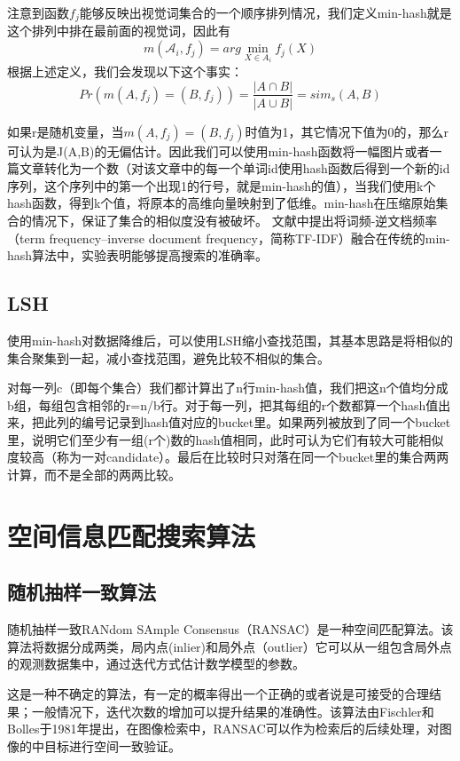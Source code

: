 注意到函数\(f_j\)能够反映出视觉词集合的一个顺序排列情况，我们定义min-hash就是这个排列中排在最前面的视觉词，因此有
\[m(\mathcal{A}_i,f_j)= arg\mathop {\min }\limits_{X \in A_i}f_j(X)\]
根据上述定义，我们会发现以下这个事实：
\[Pr(m(A,f_j) = (B,f_j)) = \frac{|A\cap{B}|}{|A\cup{B}|} = sim_s(A,B)\]

如果r是随机变量，当\(m(A,f_j) = (B,f_j)\)时值为1，其它情况下值为0的，那么r可认为是J(A,B)的无偏估计。因此我们可以使用min-hash函数将一幅图片或者一篇文章转化为一个数（对该文章中的每一个单词id使用hash函数后得到一个新的id序列，这个序列中的第一个出现1的行号，就是min-hash的值），当我们使用k个hash函数，得到k个值，将原本的高维向量映射到了低维。min-hash在压缩原始集合的情况下，保证了集合的相似度没有被破坏。
文献\cite{Chum:2008jo}中提出将词频-逆文档频率（term frequency–inverse document frequency，简称TF-IDF）融合在传统的min-hash算法中，实验表明能够提高搜索的准确率。

\subsection{LSH}
使用min-hash对数据降维后，可以使用LSH缩小查找范围，其基本思路是将相似的集合聚集到一起，减小查找范围，避免比较不相似的集合。

对每一列c（即每个集合）我们都计算出了n行min-hash值，我们把这n个值均分成b组，每组包含相邻的r=n/b行。对于每一列，把其每组的r个数都算一个hash值出来，把此列的编号记录到hash值对应的bucket里。如果两列被放到了同一个bucket里，说明它们至少有一组(r个)数的hash值相同，此时可认为它们有较大可能相似度较高（称为一对candidate）。最后在比较时只对落在同一个bucket里的集合两两计算，而不是全部的两两比较。

\section{空间信息匹配搜索算法}

\subsection{随机抽样一致算法}
随机抽样一致RANdom SAmple Consensus（RANSAC）是一种空间匹配算法。该算法将数据分成两类，局内点(inlier)和局外点（outlier）它可以从一组包含局外点的观测数据集中，通过迭代方式估计数学模型的参数。

这是一种不确定的算法，有一定的概率得出一个正确的或者说是可接受的合理结果；一般情况下，迭代次数的增加可以提升结果的准确性。该算法由Fischler和Bolles于1981年提出，在图像检索中，RANSAC可以作为检索后的后续处理，对图像的中目标进行空间一致验证。

